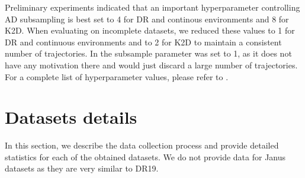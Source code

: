 \documentclass{article}
\begin{document}
Preliminary experiments indicated that an important hyperparameter controlling AD subsampling is best set to 4 for DR and continous environments and 8 for K2D. When evaluating on incomplete datasets, we reduced these values to 1 for DR and continuous environments and to 2 for K2D to maintain a consistent number of trajectories. In  the subsample parameter was set to 1, as it does not have any motivation there and would just discard a large number of trajectories.
For a complete list of hyperparameter values, please refer to .
\section{Datasets details}
\label{app:datasets}
In this section, we describe the data collection process and provide detailed statistics for each of the obtained datasets. We do not provide data for Janus datasets as they are very similar to DR19.
\end{document}
